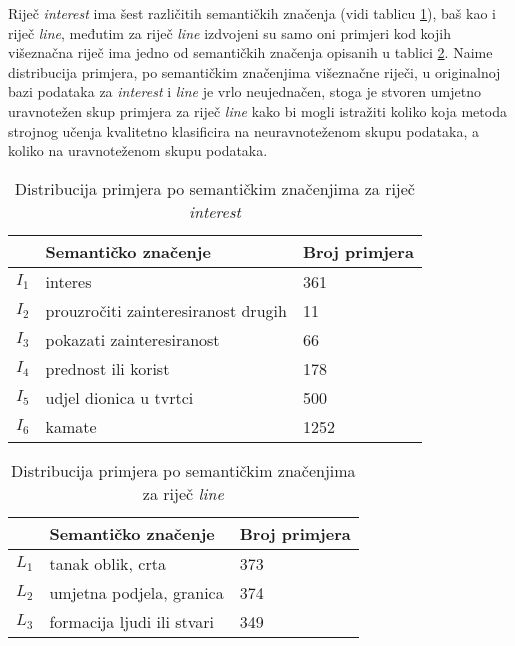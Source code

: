 \documentclass[10pt, a4paper]{article}
\begin{document}
Riječ \emph{interest} ima šest različitih semantičkih značenja (vidi tablicu \ref{tab:interest_distribution}), baš kao i riječ \emph{line},
međutim za riječ \emph{line} izdvojeni su samo oni primjeri kod kojih višeznačna riječ ima
jedno od semantičkih značenja opisanih u tablici \ref{tab:line_distribution}.
Naime distribucija primjera, po semantičkim značenjima višeznačne riječi, u 
originalnoj bazi podataka za \emph{interest} i \emph{line} je vrlo neujednačen,
stoga je stvoren umjetno uravnotežen skup primjera za riječ \emph{line} kako
bi mogli istražiti koliko koja metoda strojnog učenja
kvalitetno klasificira na neuravnoteženom skupu podataka, 
a koliko na uravnoteženom skupu podataka.

\begin{table}[!hbtp]
\caption{Distribucija primjera po semantičkim značenjima za riječ \emph{interest}}
\label{tab:interest_distribution}
\begin{center}
\begin{tabular}{lll}
\toprule
& Semantičko značenje & Broj primjera \\
\midrule
$I_1$ & interes  	 									& 361\\
$I_2$ & prouzročiti zainteresiranost drugih 			& 11\\
$I_3$ & pokazati zainteresiranost						& 66\\
$I_4$ & prednost ili korist 							& 178\\
$I_5$ & udjel dionica u tvrtci  						& 500\\
$I_6$ & kamate 											& 1252\\
\bottomrule
\end{tabular}
\end{center}
\end{table}

\begin{table}[!hbtp]
\caption{Distribucija primjera po semantičkim značenjima za riječ \emph{line}}
\label{tab:line_distribution}
\begin{center}
\begin{tabular}{lll}
\toprule
& Semantičko značenje & Broj primjera \\
\midrule
$L_1$ & tanak oblik, crta							& 373\\
$L_2$ & umjetna podjela, granica 					& 374\\
$L_3$ & formacija ljudi ili stvari					& 349\\
\bottomrule
\end{tabular}
\end{center}
\end{table}
\end{document}
